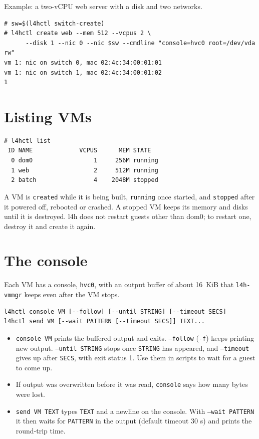 \documentclass[11pt,a4paper]{report}
\newcommand{\cmd}[1]{\texttt{#1}}
\begin{document}
Example: a two-vCPU web server with a disk and two networks.
\begin{lstlisting}
# sw=$(l4hctl switch-create)
# l4hctl create web --mem 512 --vcpus 2 \
      --disk 1 --nic 0 --nic $sw --cmdline "console=hvc0 root=/dev/vda rw"
vm 1: nic on switch 0, mac 02:4c:34:00:01:01
vm 1: nic on switch 1, mac 02:4c:34:00:01:02
1
\end{lstlisting}

\section{Listing VMs}

\begin{lstlisting}
# l4hctl list
 ID NAME             VCPUS      MEM STATE
  0 dom0                 1     256M running
  1 web                  2     512M running
  2 batch                4    2048M stopped
\end{lstlisting}
A VM is \texttt{created} while it is being built, \texttt{running} once
started, and \texttt{stopped} after it powered off, rebooted or crashed. A
stopped VM keeps its memory and disks until it is destroyed. l4h does not
restart guests other than dom0; to restart one, destroy it and create it
again.

\section{The console}

Each VM has a console, \texttt{hvc0}, with an output buffer of about 16~KiB
that \texttt{l4h-vmmgr} keeps even after the VM stops.

\begin{lstlisting}
l4hctl console VM [--follow] [--until STRING] [--timeout SECS]
l4hctl send VM [--wait PATTERN [--timeout SECS]] TEXT...
\end{lstlisting}

\begin{itemize}
  \item \cmd{console VM} prints the buffered output and exits.
        \texttt{--follow} (\texttt{-f}) keeps printing new output.
        \texttt{--until STRING} stops once \texttt{STRING} has appeared,
        and \texttt{--timeout} gives up after \texttt{SECS}, with exit
        status 1. Use them in scripts to wait for a guest to come up.
  \item If output was overwritten before it was read, \cmd{console} says how
        many bytes were lost.
  \item \cmd{send VM TEXT} types \texttt{TEXT} and a newline on the
        console. With \texttt{--wait PATTERN} it then waits for
        \texttt{PATTERN} in the output (default timeout 30 s) and prints
        the round-trip time.
\end{itemize}
\end{document}
